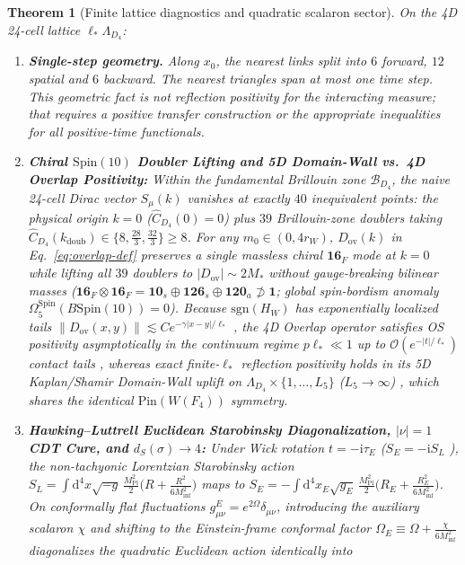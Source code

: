 \documentclass[11pt,a4paper]{article}
\newtheorem{theorem}{Theorem}[section]
\begin{document}
\begin{theorem}[Finite lattice diagnostics and quadratic scalaron sector]
\label{thm:os-cdt}
On the 4D 24-cell lattice $\ell_*\Lambda_{D_4}$:
\begin{enumerate}[label=(\roman*),leftmargin=1.9em,itemsep=2pt]
\item \textbf{Single-step geometry.} Along $x_0$, the nearest links split into $6$ forward, $12$ spatial and $6$ backward. The nearest triangles span at most one time step. This geometric fact is not reflection positivity for the interacting measure; that requires a positive transfer construction or the appropriate inequalities for all positive-time functionals.
\item \textbf{Chiral $\mathrm{Spin}(10)$ Doubler Lifting and 5D Domain-Wall vs.\ 4D Overlap Positivity:} Within the fundamental Brillouin zone $\mathcal{B}_{D_4}$, the naive 24-cell Dirac vector $S_\mu(k)$ vanishes at exactly $40$ inequivalent points: the physical origin $k = 0$ ($\widehat{C}_{D_4}(0) = 0$) plus $39$ Brillouin-zone doublers taking $\widehat{C}_{D_4}(k_{\mathrm{doub}}) \in \{8, \frac{28}{3}, \frac{32}{3}\} \ge 8$. For any $m_0 \in (0, 4 r_W)$, $D_{\mathrm{ov}}(k)$ in Eq.~\eqref{eq:overlap-def} preserves a single massless chiral $\mathbf{16}_F$ mode at $k = 0$ while lifting all $39$ doublers to $|D_{\mathrm{ov}}| \sim 2 M_*$ without gauge-breaking bilinear masses ($\mathbf{16}_F \otimes \mathbf{16}_F = \mathbf{10}_s \oplus \mathbf{126}_s \oplus \mathbf{120}_a \not\supset \mathbf{1}$; global spin-bordism anomaly $\Omega_5^{\mathrm{Spin}}(B\mathrm{Spin}(10)) = 0$). Because $\mathrm{sgn}(H_W)$ has exponentially localized tails $\|D_{\mathrm{ov}}(x,y)\| \lesssim C e^{-\gamma|x-y|/\ell_*}$ \cite{HernandezJansenLuscher1999}, the 4D Overlap operator satisfies OS positivity \emph{asymptotically} in the continuum regime $p\ell_* \ll 1$ up to $\mathcal{O}(e^{-|t|/\ell_*})$ contact tails \cite{Luscher2001}, whereas \emph{exact finite-$\ell_*$ reflection positivity} holds in its 5D Kaplan/Shamir Domain-Wall uplift on $\Lambda_{D_4} \times \{1,\dots,L_5\}$ ($L_5 \to \infty$) \cite{FurmanShamir1995}, which shares the identical $\mathrm{Pin}(W(F_4))$ symmetry.
\item \textbf{Hawking--Luttrell Euclidean Starobinsky Diagonalization, $|\nu|=1$ CDT Cure, and $d_S(\sigma) \to 4$:} Under Wick rotation $t = -\mathrm{i}\tau_E$ ($S_E = -\mathrm{i}S_L$ \cite{HawkingLuttrell1984}), the non-tachyonic Lorentzian Starobinsky action $S_L = \int\mathrm{d}^4x\sqrt{-g}\,\frac{M_{\mathrm{Pl}}^2}{2}\bigl(R + \frac{R^2}{6 M_{\mathrm{inf}}^2}\bigr)$ maps to $S_E = -\int\mathrm{d}^4x_E\sqrt{g_E}\,\frac{M_{\mathrm{Pl}}^2}{2}\bigl(R_E + \frac{R_E^2}{6 M_{\mathrm{inf}}^2}\bigr)$. On conformally flat fluctuations $g_{\mu\nu}^E = e^{2\Omega}\delta_{\mu\nu}$, introducing the auxiliary scalaron $\chi$ and shifting to the Einstein-frame conformal factor $\Omega_E \equiv \Omega + \frac{\chi}{6 M_{\mathrm{inf}}^2}$ diagonalizes the quadratic Euclidean action identically into

\end{enumerate}
\end{theorem}
\end{document}
